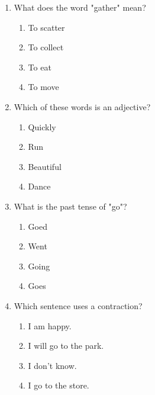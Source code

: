 \documentclass[12pt]{article}
\begin{document}
\begin{enumerate}
    \item What does the word "gather" mean?

    \begin{enumerate}[label=\Alph*.]
        \item To scatter
        \item To collect
        \item To eat
        \item To move
    \end{enumerate}

    \vspace{0.5cm}

    \item Which of these words is an adjective?

    \begin{enumerate}[label=\Alph*.]
        \item Quickly
        \item Run
        \item Beautiful
        \item Dance
    \end{enumerate}

    \vspace{0.5cm}

    \item What is the past tense of "go"?

    \begin{enumerate}[label=\Alph*.]
        \item Goed
        \item Went
        \item Going
        \item Goes
    \end{enumerate}

    \vspace{0.5cm}

    \item Which sentence uses a contraction?

    \begin{enumerate}[label=\Alph*.]
        \item I am happy.
        \item I will go to the park.
        \item I don't know.
        \item I go to the store.
    \end{enumerate}


\end{enumerate}
\end{document}

